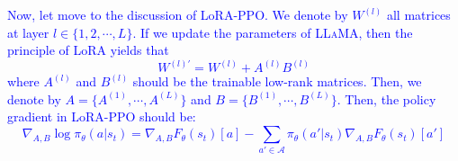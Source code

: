 \textcolor{blue}{
Now, let move to the discussion of LoRA-PPO. We denote by $W^{(l)}$ all matrices at layer $l\in\{1,2,\cdots,L\}$. If we update the parameters of \textsc{LLaMA}, then the principle of LoRA yields that
\begin{equation*}
    W^{(l)'} = W^{(l)} + A^{(l)}B^{(l)}
\end{equation*}
where $A^{(l)}$ and $B^{(l)}$ should be the trainable low-rank matrices. Then, we denote by $A=\{A^{(1)},\cdots,A^{(L)}\}$ and $B=\{B^{(1)},\cdots,B^{(L)}\}$. Then, the policy gradient in LoRA-PPO should be:
\small
\begin{equation*}
    \nabla_{A,B}\log{\pi_\theta(a|s_t)}=\nabla_{A,B}F_\theta(s_t)[a]-\sum\limits_{a'\in\mathcal{A}}\pi_\theta(a'|s_t)\nabla_{A,B}F_\theta(s_t)[a']
\end{equation*}
}